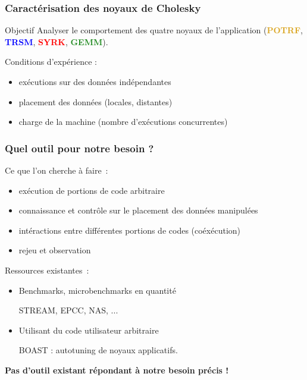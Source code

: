 \documentclass[xcolor={usenames,dvipsnames,svgnames,table}, aspectratio=43]{beamer}
\renewcommand{\emph}[1]{{\usebeamercolor[fg]{titlelike}#1}}
\newcommand{\potrfcolor}[1]{\textcolor{Goldenrod}{\textbf{#1}}\xspace}
\newcommand{\potrf}{\potrfcolor{POTRF}}
\newcommand{\trsmcolor}[1]{\textcolor{blue}{\textbf{#1}}\xspace}
\newcommand{\trsm}{\trsmcolor{TRSM}}
\newcommand{\syrkcolor}[1]{\textcolor{red}{\textbf{#1}}\xspace}
\newcommand{\syrk}{\syrkcolor{SYRK}}
\newcommand{\gemmcolor}[1]{\textcolor{ForestGreen}{\textbf{#1}}\xspace}
\newcommand{\gemm}{\gemmcolor{GEMM}}
\begin{document}
\begin{frame}
\frametitle{Caractérisation des noyaux de Cholesky}

\begin{block}{Objectif}
  Analyser le comportement des quatre noyaux de l'application (\potrf, \trsm, \syrk, \gemm).

  Conditions d'expérience :
  \begin{itemize}
    \item exécutions sur des données \emph{indépendantes}
    \item placement des données (locales, distantes)
    \item charge de la machine (nombre d'exécutions concurrentes)
  \end{itemize}
\end{block}

\end{frame}




\begin{frame}
  \frametitle{Quel outil pour notre besoin ?}

  Ce que l'on cherche à faire~:
  \begin{itemize}
    \item exécution de portions de code arbitraire
    \item connaissance et contrôle sur le placement des données manipulées
    \item intéractions entre différentes portions de codes (coéxécution)
    \item rejeu et observation
  \end{itemize}

  Ressources existantes~:
  \begin{itemize}
    \item Benchmarks, microbenchmarks en quantité

      STREAM, EPCC, NAS, ...

    \item Utilisant du code utilisateur arbitraire

      BOAST : autotuning de noyaux applicatifs.
  \end{itemize}

  \textbf{Pas d'outil existant répondant à notre besoin précis !}

\end{frame}
\end{document}
